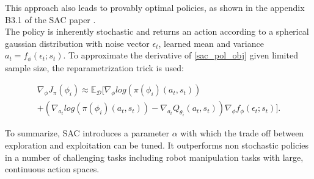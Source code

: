 This approach also leads to provably optimal policies, as shown in the appendix B3.1 of the SAC paper \cite{haarnoja2018soft}. \\
The policy is inherently stochastic and returns an action according to a spherical gaussian distribution with noise vector $\epsilon_t$, learned mean and variance $a_t = f_{\phi}(\epsilon_t;s_t)$. 
To approximate the derivative of \ref{sac_pol_obj} given limited sample size, the reparametrization trick is used:

\begin{equation}
    \label{SAC_update_rule}
    \begin{align}
        \nabla_{\phi}J_\pi(\phi_{i}) \approx \mathbb{E}_{\mathcal{D}} [\nabla_{\phi} log (\pi(\phi_{i})(a_t, s_t))\\
        + \left( \nabla_{a_t} log (\pi(\phi_{i})(a_t, s_t)) - \nabla_{a_t} Q_{\theta_i}(a_t, s_t) \right) \nabla_{\phi} f_{\phi}(\epsilon_t;s_t)].
    \end{align}
\end{equation}



To summarize, SAC introduces a parameter $\alpha$ with which the trade off between exploration and exploitation can be tuned. It outperforms non stochastic 
policies in a number of challenging tasks including robot manipulation tasks with large, continuous action spaces.

